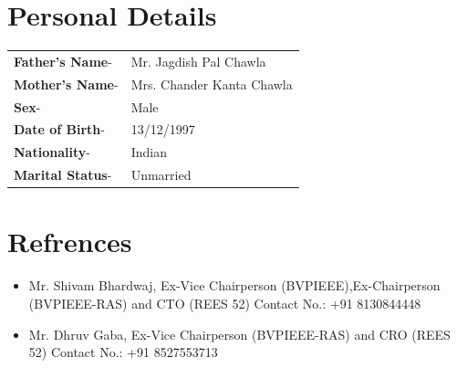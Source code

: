 \documentclass[11pt]{article}
\begin{document}
\begin{minipage}{0.80\linewidth}
\section{\color{yellow}Per\color{black}sonal Details}
\begin{tabular}{l l}
\textbf{Father's Name}-& Mr. Jagdish Pal Chawla\\ 
\textbf{Mother's Name}-& Mrs. Chander Kanta Chawla\\
\textbf{Sex}-& Male\\
\textbf{Date of Birth}-& 13/12/1997\\
\textbf{Nationality}-& Indian\\
\textbf{Marital Status}-& Unmarried\\
\end{tabular}
\section{\color{magenta}Ref\color{black}rences}
\begin{itemize}
\item Mr. Shivam Bhardwaj, Ex-Vice Chairperson (BVPIEEE),Ex-Chairperson (BVPIEEE-RAS) and CTO (REES 52)
Contact No.: +91 8130844448
\item Mr. Dhruv Gaba, Ex-Vice Chairperson (BVPIEEE-RAS) and CRO (REES 52)
Contact No.: +91 8527553713
\end{itemize}
\end{minipage}
\end{document}
